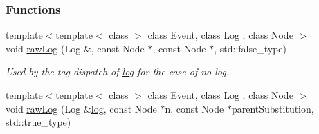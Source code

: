 \subsubsection*{Functions}
\begin{DoxyCompactItemize}
\item 
{\footnotesize template$<$template$<$ class $>$ class Event, class Log , class Node $>$ }\\void \hyperlink{namespaceslb_1_1core_1_1ui_aa1e849c76c123d3e5cfb494767437bb6}{raw\+Log} (Log \&, const Node $\ast$, const Node $\ast$, std\+::false\+\_\+type)\hypertarget{namespaceslb_1_1core_1_1ui_aa1e849c76c123d3e5cfb494767437bb6}{}\label{namespaceslb_1_1core_1_1ui_aa1e849c76c123d3e5cfb494767437bb6}

\begin{DoxyCompactList}\small\item\em Used by the tag dispatch of \hyperlink{namespaceslb_1_1core_1_1ui_acdeb0db1847459cac6f4eeb22bbb5998}{log} for the case of no log. \end{DoxyCompactList}\item 
{\footnotesize template$<$template$<$ class $>$ class Event, class Log , class Node $>$ }\\void \hyperlink{namespaceslb_1_1core_1_1ui_ae62020bcc18da65bf9a08edd7bd04e97}{raw\+Log} (Log \&\hyperlink{namespaceslb_1_1core_1_1ui_acdeb0db1847459cac6f4eeb22bbb5998}{log}, const Node $\ast$n, const Node $\ast$parent\+Substitution, std\+::true\+\_\+type)\hypertarget{namespaceslb_1_1core_1_1ui_ae62020bcc18da65bf9a08edd7bd04e97}{}\label{namespaceslb_1_1core_1_1ui_ae62020bcc18da65bf9a08edd7bd04e97}


\end{DoxyCompactItemize}
